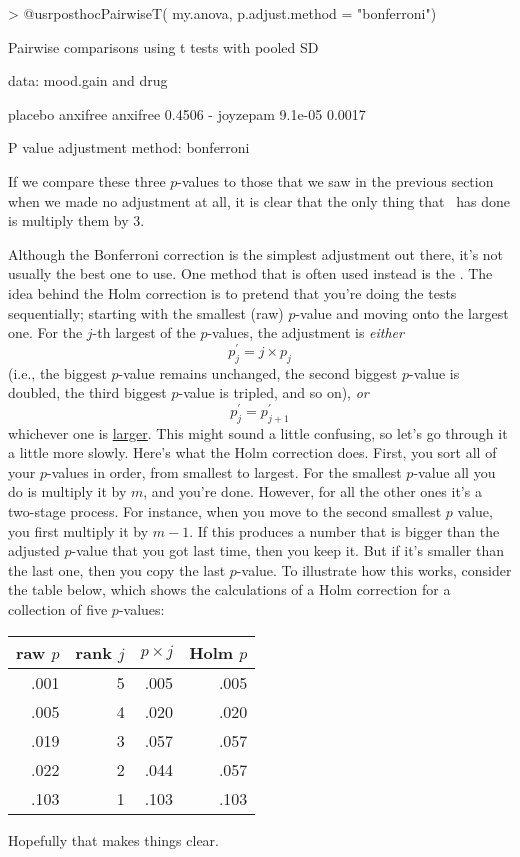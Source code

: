 \begin{rblock1}
> @usr{posthocPairwiseT( my.anova, p.adjust.method = "bonferroni")}

	Pairwise comparisons using t tests with pooled SD 

data:  mood.gain and drug 

         placebo anxifree
anxifree 0.4506  -       
joyzepam 9.1e-05 0.0017  

P value adjustment method: bonferroni 
\end{rblock1}
If we compare these three $p$-values to those that we saw in the previous section when we made no adjustment at all, it is clear that the only thing that \R\ has done is multiply them by 3. 


Although the Bonferroni correction is the simplest adjustment out there, it's not usually the best one to use. One method that is often used instead is the  \cite{Holm1979}. The idea behind the Holm correction is to pretend that you're doing the tests sequentially; starting with the smallest (raw) $p$-value and moving onto the largest one. For the $j$-th largest of the $p$-values, the adjustment is {\it either}
$$
p^\prime_j = j \times p_j 
$$
(i.e., the biggest $p$-value remains unchanged, the second biggest $p$-value is doubled, the third biggest $p$-value is tripled, and so on), {\it or}
$$
p^\prime_j = p^\prime_{j+1}
$$
whichever one is \underline{larger}. This might sound a little confusing, so let's go through it a little more slowly. Here's what the Holm correction does. First, you sort all of your $p$-values in order, from smallest to largest. For the smallest $p$-value all you do is multiply it by $m$, and you're done. However, for all the other ones it's a two-stage process. For instance, when you move to the second smallest $p$ value, you first multiply it by $m-1$. If this produces a number that is bigger than the adjusted $p$-value that you got last time, then you keep it. But if it's smaller than the last one, then you copy the last $p$-value. To illustrate how this works, consider the table below, which shows the calculations of a Holm correction for a collection of five $p$-values:
\begin{center}
\begin{tabular}{rrrr} 
 raw $p$ & rank $j$ & $p \times j$ & Holm $p$   \\ \hline
.001 & 5 & .005 & .005 \\
.005 & 4 & .020 & .020 \\
.019 & 3 & .057 & .057 \\
.022 & 2 & .044 & .057 \\
.103 & 1 & .103 & .103 \\
\end{tabular}
\end{center}
Hopefully that makes things clear. 

